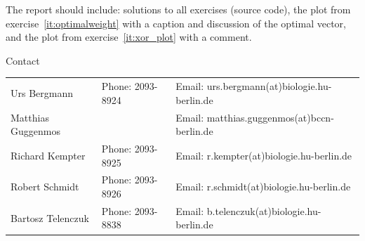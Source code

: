 \documentclass[12pt, a4]{article}
\begin{document}
The report should include: solutions to all exercises (source code), the plot
from exercise~\ref{it:optimalweight} with a caption and discussion of
the optimal vector, and the plot from exercise~\ref{it:xor_plot} with a
comment.

\vfill
\centerline{\CAP Contact}
\CAP

\begin{tabular}{lll}
Urs Bergmann & Phone: 2093-8924 & Email:
urs.bergmann(at)biologie.hu-berlin.de \\
Matthias Guggenmos & & Email: matthias.guggenmos(at)bccn-berlin.de \\
Richard Kempter \hfill & Phone: 2093-8925 \hfill & Email:
r.kempter(at)biologie.hu-berlin.de \\
Robert Schmidt & Phone: 2093-8926 & Email: r.schmidt(at)biologie.hu-berlin.de
\\
Bartosz Telenczuk & Phone: 2093-8838 & Email:
b.telenczuk(at)biologie.hu-berlin.de \\
\end{tabular}
\end{document}
